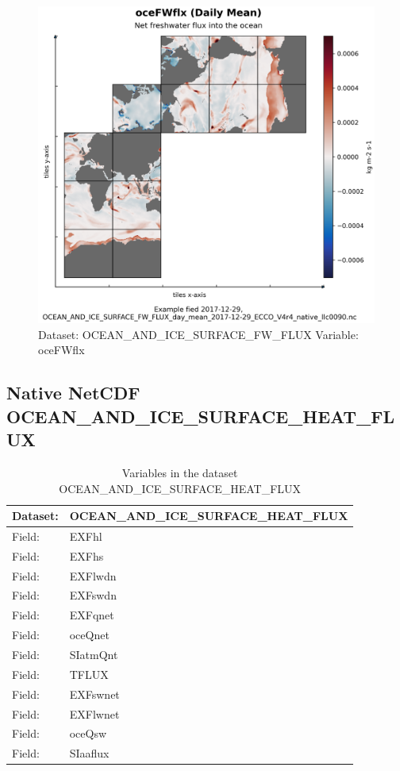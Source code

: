 \begin{figure}[H]
\centering
\includegraphics[width=\textwidth]{../images/plots/native_plots/Ocean_and_Sea-Ice_Surface_Freshwater_Fluxes/oceFWflx.png}
\caption{Dataset: OCEAN\_AND\_ICE\_SURFACE\_FW\_FLUX Variable: oceFWflx}
\label{tab:table-OCEAN_AND_ICE_SURFACE_FW_FLUX_oceFWflx-Plot}
\end{figure}
\pagebreak
\subsection{Native NetCDF OCEAN\_AND\_ICE\_SURFACE\_HEAT\_FLUX}
\newp
\begin{longtable}{|p{}|p{}|}
\caption{Variables in the dataset OCEAN\_AND\_ICE\_SURFACE\_HEAT\_FLUX}
\label{tab:table-OCEAN_AND_ICE_SURFACE_HEAT_FLUX-fields} \\ 
\hline \endhead \hline \endfoot
\rowcolor{lightgray} \textbf{Dataset:} & \textbf{OCEAN\_AND\_ICE\_SURFACE\_HEAT\_FLUX} \\ \hline
Field: &EXFhl \\ \hline
Field: &EXFhs \\ \hline
Field: &EXFlwdn \\ \hline
Field: &EXFswdn \\ \hline
Field: &EXFqnet \\ \hline
Field: &oceQnet \\ \hline
Field: &SIatmQnt \\ \hline
Field: &TFLUX \\ \hline
Field: &EXFswnet \\ \hline
Field: &EXFlwnet \\ \hline
Field: &oceQsw \\ \hline
Field: &SIaaflux \\ \hline
\end{longtable}

